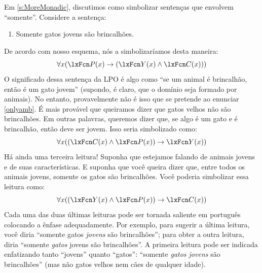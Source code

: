 Em \cref{s:MoreMonadic}, discutimos como simbolizar sentenças que envolvem \textquotedblleft somente\textquotedblright{}. Considere a sentença:
\begin{enumerate}
\item\label{onlyamb} Somente gatos jovens são brincalhões.
\end{enumerate}
De acordo com nosso esquema, nós a simbolizaríamos desta maneira:
\[
	\forall x(\atom{P}{x} \eif (\atom{Y}{x} \eand \atom{C}{x}))
\]
O significado dessa sentença da LPO é algo como \textquotedblleft se um animal é brincalhão, então é um gato jovem\textquotedblright{} (supondo, é claro, que o domínio seja formado por animais). No entanto, provavelmente não é isso que se pretende ao enunciar \cref*{onlyamb}. É mais provável que queiramos dizer que gatos velhos não são brincalhões. Em outras palavras, queremos dizer que, se algo é um gato e é brincalhão, então deve ser jovem. Isso seria simbolizado como:
\[
	\forall x((\atom{C}{x} \eand \atom{P}{x}) \eif \atom{Y}{x})
\]
Há ainda uma terceira leitura! Suponha que estejamos falando de animais jovens e de suas características. E suponha que você queira dizer que, entre todos os animais jovens, somente os gatos são brincalhões. Você poderia simbolizar essa leitura como:
\[
	\forall x((\atom{Y}{x} \eand \atom{P}{x}) \eif \atom{C}{x})
\]
Cada uma das duas últimas leituras pode ser tornada saliente em português colocando a ênfase adequadamente. Por exemplo, para sugerir a última leitura, você diria \textquotedblleft somente gatos \emph{jovens} são brincalhões\textquotedblright{}; para obter a outra leitura, diria \textquotedblleft somente \emph{gatos} jovens são brincalhões\textquotedblright{}. A primeira leitura pode ser indicada enfatizando tanto \textquotedblleft jovens\textquotedblright{} quanto \textquotedblleft gatos\textquotedblright{}: \textquotedblleft somente \emph{gatos jovens} são brincalhões\textquotedblright{} (mas não gatos velhos nem cães de qualquer idade).

